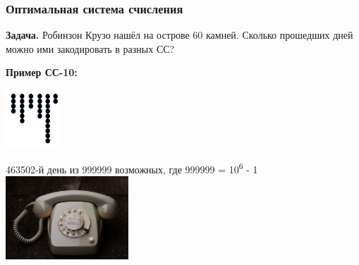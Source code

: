\documentclass[t, 10pt, handout, aspectratio=169]{beamer}
\begin{document}
\begin{frame}
  \frametitle{Оптимальная система счисления}
    \textbf{Задача.} Робинзон Крузо нашёл на острове 60 камней. Сколько прошедших дней можно ими закодировать в разных СС?
    \setlength{\columnsep}{30pt}
    \\[12pt]
    \begin{minipage}[t]{0.25\linewidth}
        \vspace{6pt}
        \textbf{Пример СС-10:}
    \end{minipage}
    \begin{minipage}[t]{0.25\linewidth}
        \vspace{0pt}
        \includegraphics[width=2cm, scale=0.4]{logos/crusoe_dots1.png}
    \end{minipage}
    \begin{minipage}[t]{0.4\linewidth}
        \vspace{0pt}
        463502-й день из 999999 возможных, где 999999 = 10\textsuperscript{6} - 1 \\[0.3cm]
        \includegraphics[width=4.6cm, scale=0.4]{logos/iphone20promax.png}
    \end{minipage}
\end{frame}
\end{document}
